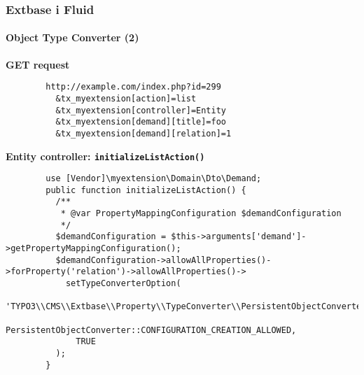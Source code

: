 
\begin{frame}[fragile]
	\frametitle{Extbase i Fluid}
	\framesubtitle{Object Type Converter (2)}

	\lstset{
		basicstyle=\tiny\ttfamily
	}

	\smaller\textbf{GET request}\normalsize
	\begin{lstlisting}
		http://example.com/index.php?id=299
		  &tx_myextension[action]=list
		  &tx_myextension[controller]=Entity
		  &tx_myextension[demand][title]=foo
		  &tx_myextension[demand][relation]=1
	\end{lstlisting}

	\smaller\textbf{Entity controller: \texttt{initializeListAction()}}\normalsize
	\begin{lstlisting}
		use [Vendor]\myextension\Domain\Dto\Demand;
		public function initializeListAction() {
		  /**
		   * @var PropertyMappingConfiguration $demandConfiguration
		   */
		  $demandConfiguration = $this->arguments['demand']->getPropertyMappingConfiguration();
		  $demandConfiguration->allowAllProperties()->forProperty('relation')->allowAllProperties()->
		    setTypeConverterOption(
		      'TYPO3\\CMS\\Extbase\\Property\\TypeConverter\\PersistentObjectConverter',
		      PersistentObjectConverter::CONFIGURATION_CREATION_ALLOWED,
		      TRUE
		  );
		}
	\end{lstlisting}

\end{frame}


